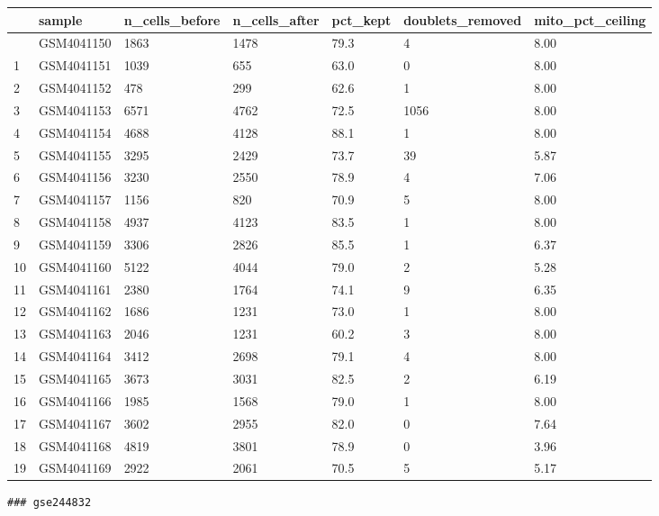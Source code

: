 \documentclass[
  letterpaper,
  DIV=11,
  numbers=noendperiod]{scrartcl}
\newcounter{none} %
\begin{document}
{\def\LTcaptype{none} %
\begin{longtable}[]{@{}lllllll@{}}
\toprule\noalign{}
& sample & n\_cells\_before & n\_cells\_after & pct\_kept &
doublets\_removed & mito\_pct\_ceiling \\
\midrule\noalign{}
\endhead
\bottomrule\noalign{}
\endlastfoot
0 & GSM4041150 & 1863 & 1478 & 79.3 & 4 & 8.00 \\
1 & GSM4041151 & 1039 & 655 & 63.0 & 0 & 8.00 \\
2 & GSM4041152 & 478 & 299 & 62.6 & 1 & 8.00 \\
3 & GSM4041153 & 6571 & 4762 & 72.5 & 1056 & 8.00 \\
4 & GSM4041154 & 4688 & 4128 & 88.1 & 1 & 8.00 \\
5 & GSM4041155 & 3295 & 2429 & 73.7 & 39 & 5.87 \\
6 & GSM4041156 & 3230 & 2550 & 78.9 & 4 & 7.06 \\
7 & GSM4041157 & 1156 & 820 & 70.9 & 5 & 8.00 \\
8 & GSM4041158 & 4937 & 4123 & 83.5 & 1 & 8.00 \\
9 & GSM4041159 & 3306 & 2826 & 85.5 & 1 & 6.37 \\
10 & GSM4041160 & 5122 & 4044 & 79.0 & 2 & 5.28 \\
11 & GSM4041161 & 2380 & 1764 & 74.1 & 9 & 6.35 \\
12 & GSM4041162 & 1686 & 1231 & 73.0 & 1 & 8.00 \\
13 & GSM4041163 & 2046 & 1231 & 60.2 & 3 & 8.00 \\
14 & GSM4041164 & 3412 & 2698 & 79.1 & 4 & 8.00 \\
15 & GSM4041165 & 3673 & 3031 & 82.5 & 2 & 6.19 \\
16 & GSM4041166 & 1985 & 1568 & 79.0 & 1 & 8.00 \\
17 & GSM4041167 & 3602 & 2955 & 82.0 & 0 & 7.64 \\
18 & GSM4041168 & 4819 & 3801 & 78.9 & 0 & 3.96 \\
19 & GSM4041169 & 2922 & 2061 & 70.5 & 5 & 5.17 \\
\end{longtable}
}

\begin{verbatim}
### gse244832
\end{verbatim}
\end{document}
